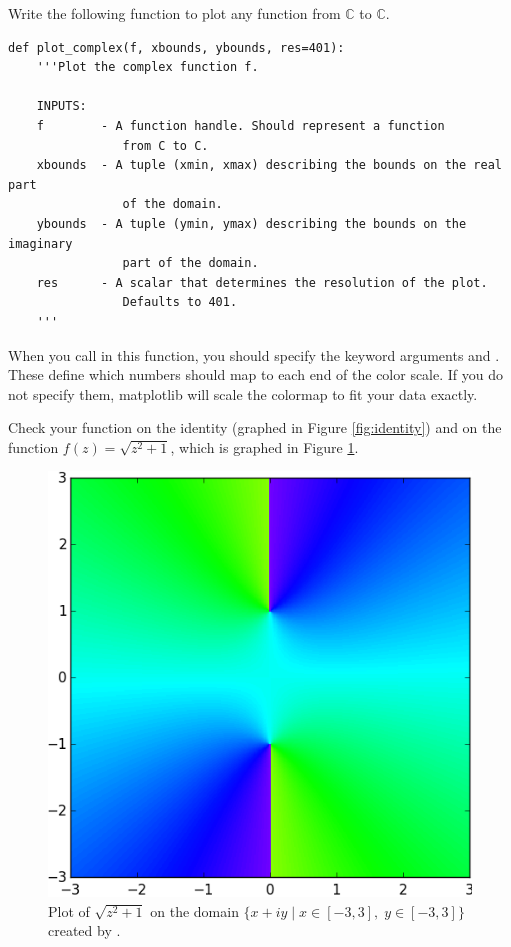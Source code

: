 \begin{problem}
Write the following function to plot any function from $\mathbb{C}$ to $\mathbb{C}$.
\begin{lstlisting}
def plot_complex(f, xbounds, ybounds, res=401):
    '''Plot the complex function f.
    
    INPUTS:
    f        - A function handle. Should represent a function 
    			from C to C.
    xbounds  - A tuple (xmin, xmax) describing the bounds on the real part 
    			of the domain.
    ybounds  - A tuple (ymin, ymax) describing the bounds on the imaginary 
    			part of the domain.
    res      - A scalar that determines the resolution of the plot. 
    			Defaults to 401.
    '''
\end{lstlisting}
When you call  in this function, you should specify the keyword arguments  and . 
These define which numbers should map to each end of the color scale. 
If you do not specify them, matplotlib will scale the colormap to fit your data exactly.


Check your function on the identity (graphed in Figure \ref{fig:identity}) and on the function $f(z) = \sqrt{z^2+1}$, which is graphed in Figure \ref{fig:check_plot}.
\begin{figure}[H]
\includegraphics[width=.7\textwidth]{check_plot.png}
\caption{Plot of $\sqrt{z^2+1}$ on the domain $\{x+iy \mid x \in [-3,3] , \; y \in [-3,3]\}$ created by .}
\label{fig:check_plot}
\end{figure}

\end{problem}


